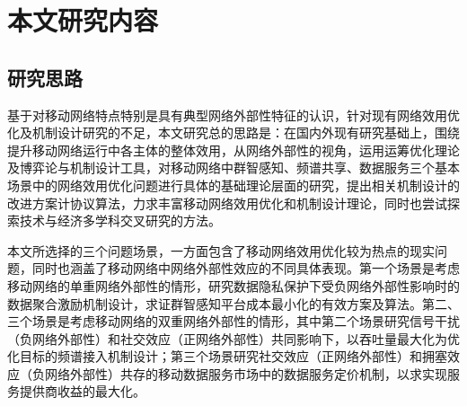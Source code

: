 \section{本文研究内容}


\subsection{研究思路}

基于对移动网络特点特别是具有典型网络外部性特征的认识，针对现有网络效用优化及机制设计研究的不足，本文研究总的思路是：在国内外现有研究基础上，围绕提升移动网络运行中各主体的整体效用，从网络外部性的视角，运用运筹优化理论及博弈论与机制设计工具，对移动网络中群智感知、频谱共享、数据服务三个基本场景中的网络效用优化问题进行具体的基础理论层面的研究，提出相关机制设计的改进方案计协议算法，力求丰富移动网络效用优化和机制设计理论，同时也尝试探索技术与经济多学科交叉研究的方法。

本文所选择的三个问题场景，一方面包含了移动网络效用优化较为热点的现实问题，同时也涵盖了移动网络中网络外部性效应的不同具体表现。第一个场景是考虑移动网络的单重网络外部性的情形，研究数据隐私保护下受负网络外部性影响时的数据聚合激励机制设计，求证群智感知平台成本最小化的有效方案及算法。第二、三个场景是考虑移动网络的双重网络外部性的情形，其中第二个场景研究信号干扰（负网络外部性）和社交效应（正网络外部性）共同影响下，以吞吐量最大化为优化目标的频谱接入机制设计；第三个场景研究社交效应（正网络外部性）和拥塞效应（负网络外部性）共存的移动数据服务市场中的数据服务定价机制，以求实现服务提供商收益的最大化。


